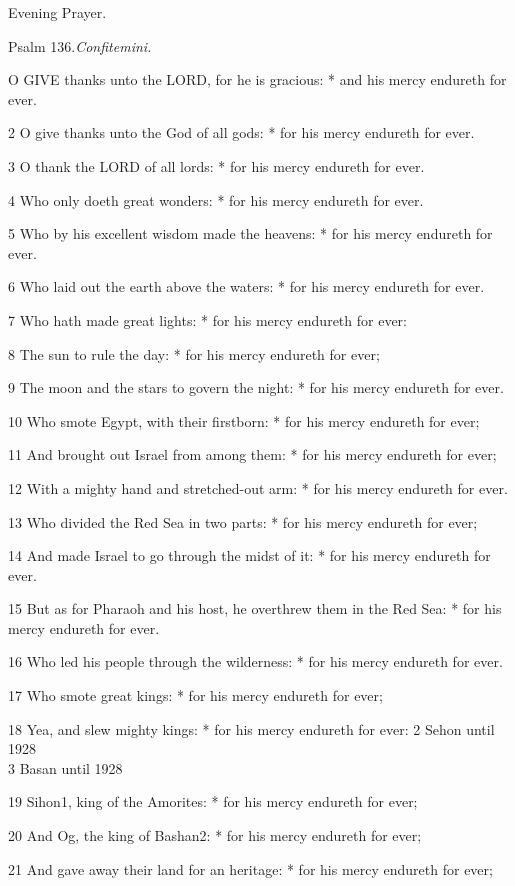 Evening
Prayer.

Psalm
136.\emph{Confitemini.}

O
GIVE thanks unto the LORD, for he is gracious: * and his mercy endureth
for ever.

2 O give thanks unto the God of all gods: * for his
mercy endureth for ever.

3 O thank the LORD of all lords: * for his mercy endureth
for ever.

4 Who only doeth great wonders: * for his mercy endureth
for ever.

5 Who by his excellent wisdom made the heavens: * for
his mercy endureth for ever.

6 Who laid out the earth above the waters: * for his
mercy endureth for ever.

7 Who hath made great lights: * for his mercy endureth
for ever:

8 The sun to rule the day: * for his mercy endureth
for ever;

9 The moon and the stars to govern the night: * for
his mercy endureth for ever.

10 Who smote Egypt, with their firstborn: * for his
mercy endureth for ever;

11 And brought out Israel from among them: * for his
mercy endureth for ever;

12 With a mighty hand and stretched-out arm: * for
his mercy endureth for ever.

13 Who divided the Red Sea in two parts: * for his
mercy endureth for ever;

14 And made Israel to go through the midst of it: *
for his mercy endureth for ever.

15 But as for Pharaoh and his host, he overthrew them
in the Red Sea: * for his mercy endureth for ever.

16 Who led his people through the wilderness: * for
his mercy endureth for ever.

17 Who smote great kings: * for his mercy endureth
for ever;

18 Yea, and slew mighty kings: * for his mercy endureth
for ever: 2
Sehon until
1928 \\
3
Basan until
1928

19 Sihon1, king of the Amorites: * for his mercy endureth for
ever;

20 And Og, the king of Bashan2: * for his
mercy endureth for ever;

21 And gave away their land for an heritage: * for
his mercy endureth for ever;

